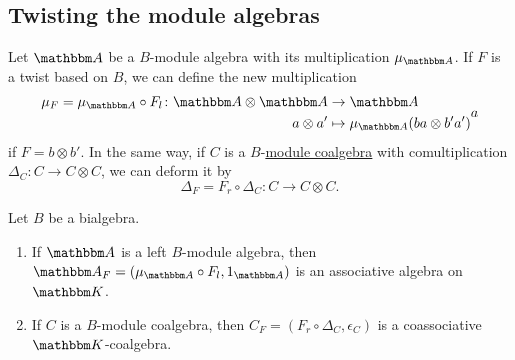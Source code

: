 \subsection{Twisting the module algebras}

Let $\eA$ be a $B$-module algebra with its multiplication $\mu_{\eA}$. If $F$ is a twist based on $B$, we can define the new multiplication
\begin{equation}
	\begin{aligned}
		\mu_F=\mu_{\eA}\circ F_l\colon \eA\otimes\eA&\to \eA \\
		a\otimes a'&\mapsto \mu_{\eA}(ba\otimes b'a') 
	\end{aligned}
a\end{equation}
if $F=b\otimes b'$. In the same way, if $C$ is a $B$-\href{http://planetmath.org/?method=l2h&from=objects&name=ModuleCoalgebra&op=getobj}{module coalgebra} with comultiplication $\Delta_C\colon C\to C\otimes C$, we can deform it by
\begin{equation}
	\Delta_F=F_r\circ\Delta_C\colon C\to C\otimes C.
\end{equation}

\begin{theorem}		\label{ThoTwistAlgEtCoalg}
	Let $B$ be a bialgebra.
	\begin{enumerate}

		\item
			If $\eA$ is a left $B$-module algebra, then $\eA_F=(\mu_{\eA}\circ F_l,1_{\eA})$ is an associative algebra on $\eK$.
		\item
			If $C$ is a $B$-module coalgebra, then $C_F=(F_r\circ\Delta_C,\epsilon_C)$ is a coassociative $\eK$-coalgebra.

	\end{enumerate}
\end{theorem}

